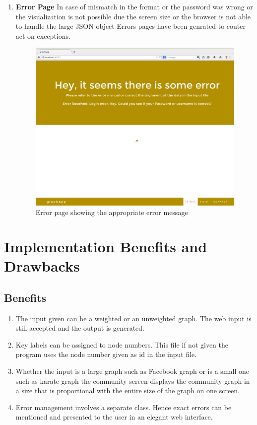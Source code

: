 \begin{enumerate}
\item \textbf{Error Page} In case of mismatch in the format or the password was wrong or the visualization is not possible due the screen size or the browser is not able to handle the large JSON object Errors pages have been genrated to couter act on exceptions. 
\begin{figure}[H]
\centering
\includegraphics[scale=0.3]{serr.png}
\caption{Error page showing the appropriate error message }
\end{figure}

\end{enumerate}






\section{Implementation Benefits and Drawbacks}
\subsection{Benefits}
\begin{enumerate}
\item The input given can be a weighted or an unweighted graph. The web input is still accepted and the output is generated.
\item Key labels can be assigned to node numbers.  This file if not given the program uses the node number given as id in the input file. 
\item Whether the input is a large graph such as Facebook graph or is a small one such as karate graph the community screen displays the community graph in a size that is proportional with the entire size of the graph on one screen. 
\item Error management involves a separate class. Hence exact errors can be mentioned and presented to the user in an elegant web interface.
\end{enumerate}
